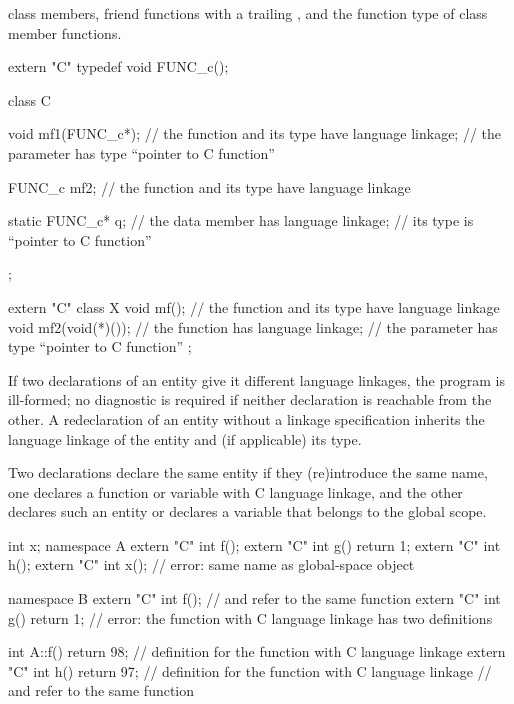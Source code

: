 class members,
friend functions with a trailing , and the
function type of class member functions.
\begin{example}
\begin{codeblock}
extern "C" typedef void FUNC_c();

class C {
  void mf1(FUNC_c*);            // the function  and its type have \Cpp{} language linkage;
                                // the parameter has type ``pointer to C function''

  FUNC_c mf2;                   // the function  and its type have \Cpp{} language linkage

  static FUNC_c* q;             // the data member  has \Cpp{} language linkage;
                                // its type is ``pointer to C function''
};

extern "C" {
  class X {
    void mf();                  // the function  and its type have \Cpp{} language linkage
    void mf2(void(*)());        // the function  has \Cpp{} language linkage;
                                // the parameter has type ``pointer to C function''
  };
}
\end{codeblock}
\end{example}

\pnum
If two declarations of an entity give it different language linkages, the
program is ill-formed; no diagnostic is required if neither declaration
is reachable from the other.
%
A redeclaration of an entity without a linkage specification
inherits the language linkage of the entity and (if applicable) its type.

\pnum
{}%
Two declarations declare the same entity
if they (re)introduce the same name,
one declares a function or variable with C language linkage,
and the other declares such an entity or declares a variable
that belongs to the global scope.
\begin{example}
\begin{codeblock}
int x;
namespace A {
  extern "C" int f();
  extern "C" int g() { return 1; }
  extern "C" int h();
  extern "C" int x();               // error: same name as global-space object 
}

namespace B {
  extern "C" int f();               //  and  refer to the same function
  extern "C" int g() { return 1; }  // error: the function  with C language linkage has two definitions
}

int A::f() { return 98; }           // definition for the function  with C language linkage
extern "C" int h() { return 97; }   // definition for the function  with C language linkage
                                    //  and  refer to the same function
\end{codeblock}
\end{example}

